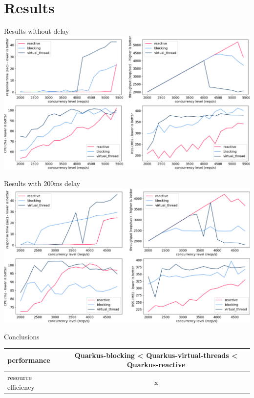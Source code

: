\documentclass{beamer}
\begin{document}
\section{Results}
\begin{frame}{Results without delay}
    \includegraphics[width=\textwidth]{assets/nano_baseline_19.0.1.png}
\end{frame}
\begin{frame}{Results with 200ms delay}
    \includegraphics[width=\textwidth]{assets/nano_200_19.0.1.png}
\end{frame}
\begin{frame}{Conclusions}
    \begin{tabular}{l | c}
        performance &  Quarkus-blocking < Quarkus-virtual-threads < Quarkus-reactive \\
        \hline
        resource efficiency & x\\
    \end{tabular}
\end{frame}
\end{document}
